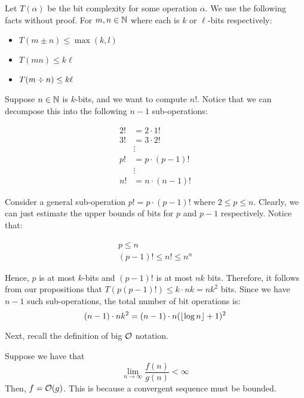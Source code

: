 \documentclass{article}
\begin{document}
\begin{crll}
Let $ T(\alpha) $ be the bit complexity for some operation $ \alpha $.
We use the following facts without proof. \vsp
For $ m, n \in \mathbb{N} $ where each is $ k $ or $ \ell $-bits respectively:
\begin{itemize}
    \item $ T(m \pm n) \leq \max(k, l) $
    \item $ T(mn) \leq k\ell $
    \item $ T(m \divisionsymbol n) \leq k\ell $
\end{itemize}
\end{crll}

\newpage
\begin{xmp}[source=Primary Source Material]
Suppose $ n \in \mathbb{N} $ is $ k $-bits, and we want to compute $ n! $.
Notice that we can decompose this into the following $ n-1 $ sub-operations:

\begin{align*}
    2! & = 2 \cdot 1! \\
    3! & = 3 \cdot 2! \\
       & \vdots \\
    p! & = p \cdot (p-1)! \\
       & \vdots \\
    n! & = n \cdot (n-1)!
\end{align*}

Consider a general sub-operation $ p! = p \cdot (p-1)! $ where $ 2 \leq p \leq n $.
Clearly, we can just estimate the upper bounds of bits for $ p $ and $ p-1 $ respectively.
Notice that:

\begin{gather*}
    p \leq n \\
    (p-1)! \leq n! \leq n^{n}
\end{gather*}

Hence, $ p $ is at most $ k $-bits and $ (p-1)! $ is at most $ nk $ bits.
Therefore, it follows from our propositions that $ T(p(p-1)!) \leq k \cdot nk = nk^{2} $ bits.
Since we have $ n-1 $ such sub-operations, the total number of bit operations is:
\begin{equation*}
    (n-1) \cdot nk^{2} = (n-1) \cdot n(\left\lfloor{\log n}\right\rfloor+1)^{2}
\end{equation*}
\end{xmp}

Next, recall the definition of big $ \mathcal{O} $ notation.
\vspace{-0.1in}

\begin{thm}
Suppose we have that
\begin{equation*}
    \lim_{n\rightarrow \infty} \dfrac{f(n)}{g(n)} < \infty
\end{equation*}
Then, $ f = \mathcal{O}(g) $. This is because a convergent sequence must be bounded.
\end{thm}
\end{document}
